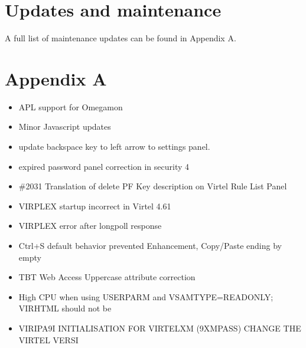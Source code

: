 \documentclass[letterpaper,10pt,english]{sphinxmanual}
\begin{document}
\chapter{Updates and maintenance}
\label{\detokenize{TN202303:updates-and-maintenance}}
\sphinxAtStartPar
A full list of maintenance updates can be found in Appendix A.

\newpage


\chapter{Appendix A}
\label{\detokenize{TN202303:appendix-a}}
\sphinxAtStartPar
{}
\begin{itemize}
\item {} 
 APL support for Omegamon

\item {} 
 Minor Javascript updates

\item {} 
 update backspace key to left arrow to settings panel.

\item {} 
 expired password panel correction in security 4

\item {} 
 \#2031 Translation of delete PF Key description on Virtel Rule List Panel

\item {} 
 VIRPLEX startup incorrect in Virtel 4.61

\item {} 
 VIRPLEX error after longpoll response

\item {} 
 Ctrl+S default behavior prevented Enhancement, Copy/Paste ending by empty

\item {} 
 TBT Web Access \sphinxhyphen{} Uppercase attribute correction

\item {} 
 High CPU when using USERPARM and VSAMTYPE=READONLY; VIRHTML should not be

\item {} 
 VIRIPA9I INITIALISATION FOR VIRTELXM (9\sphinxhyphen{}XMPASS) \sphinxhyphen{} CHANGE THE VIRTEL VERSI


\end{itemize}
\end{document}
